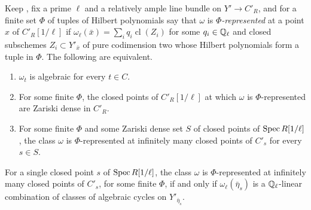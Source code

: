 \begin{theorem}\label{thm:modpdensity}
Keep , fix a prime $\ell$ and a relatively ample line bundle
on $Y'\to C'_{R}$, and for a finite set $\Phi$ of tuples of Hilbert
polynomials say that $\omega$ is \emph{$\Phi$-represented} at a point $x$ of
$C'_{R}[1/\ell]$ if $\omega_{\ell}(\bar{x})=\sum_{i}q_{i}\operatorname{cl}(Z_{i})$
for some $q_{i}\in\mathbb{Q}_{\ell}$ and closed subschemes $Z_{i}\subset Y'_{\bar{x}}$
of pure codimension two whose Hilbert polynomials form a tuple in $\Phi$. The
following are equivalent.
\begin{enumerate}[label=\textup{(\alph*)},leftmargin=2.6em,itemsep=2pt]
\item $\omega_{t}$ is algebraic for every $t\in C$.
\item For some finite $\Phi$, the closed points of $C'_{R}[1/\ell]$ at which
  $\omega$ is $\Phi$-represented are Zariski dense in $C'_{R}$.
\item For some finite $\Phi$ and some Zariski dense set $S$ of closed points of
  $\operatorname{Spec} R[1/\ell]$, the class $\omega$ is $\Phi$-represented at infinitely
  many closed points of $C'_{s}$ for every $s\in S$.
\end{enumerate}
For a single closed point $s$ of $\operatorname{Spec} R[1/\ell]$, the class $\omega$ is
$\Phi$-represented at infinitely many closed points of $C'_{s}$, for some
finite $\Phi$, if and only if $\omega_{\ell}(\bar\eta_{s})$ is a
$\mathbb{Q}_{\ell}$-linear combination of classes of algebraic cycles on
$Y'_{\bar\eta_{s}}$.
\end{theorem}

